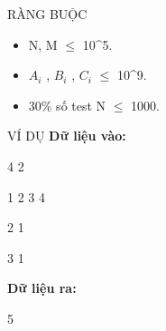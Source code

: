 RÀNG BUỘC  
\begin{itemize}
	\item     N, M  $\le$  10^5.   
	\item     $A_{i}$    , $B_{i}$    , $C_{i}$     $\le$  10^9.   
	\item     30\% số test N  $\le$  1000.   
\end{itemize}
   VÍ DỤ  
\textbf{    Dữ liệu vào:   }

   4 2  

   1 2 3 4  

   2 1  

   3 1  

\textbf{    Dữ liệu ra:   }

   5